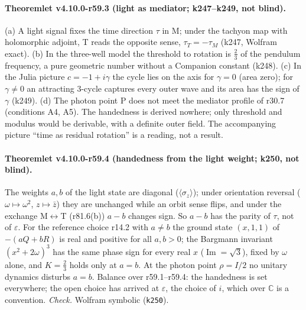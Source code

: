 \paragraph{Theoremlet v4.10.0-r59.3 (light as mediator; k247--k249, not blind).}
(a) A light signal fixes the time direction \(\tau\) in M; under the tachyon map with holomorphic adjoint, T reads the opposite sense,
\(\tau_T=-\tau_M\) (k247, Wolfram exact).
(b) In the three-well model the threshold to rotation is \(\tfrac23\) of the pendulum frequency, a pure geometric number without a Companion
constant (k248).
(c) In the Julia picture \(c=-1+i\gamma\) the cycle lies on the axis for \(\gamma=0\) (area zero); for \(\gamma\neq0\) an attracting 3-cycle captures every
outer wave and its area has the sign of \(\gamma\) (k249).
(d) The photon point P does not meet the mediator profile of r30.7 (conditions A4, A5).
The handedness is derived nowhere; only threshold and modulus would be derivable, with a definite outer field.  The accompanying picture
``time as residual rotation'' is a reading, not a result.

\paragraph{Theoremlet v4.10.0-r59.4 (handedness from the light weight; k250, not blind).}
The weights \(a,b\) of the light state are diagonal (\(\langle\sigma_z\rangle\)); under orientation reversal (\(\omega\mapsto\omega^2\), \(z\mapsto\bar z\)) they are
unchanged while an orbit sense flips, and under the exchange M\(\leftrightarrow\)T (r81.6(b)) \(a-b\) changes sign.  So \(a-b\) has the parity of \(\tau\),
not of \(\varepsilon\).  For the reference choice r14.2 with \(a\neq b\) the ground state \((x,1,1)\) of \(-(aQ+bR)\) is real and positive for all \(a,b>0\);
the Bargmann invariant \((x^2+2\omega)^3\) has the same phase sign for every real \(x\) (\(\operatorname{Im}=\sqrt3\)), fixed by \(\omega\) alone, and \(K=\tfrac23\)
holds only at \(a=b\).  At the photon point \(\rho=I/2\) no unitary dynamics disturbs \(a=b\).  Balance over r59.1--r59.4: the handedness is set
everywhere; the open choice has arrived at \(\varepsilon\), the choice of \(i\), which over \(\mathbb C\) is a convention.  \emph{Check.} Wolfram symbolic (\texttt{k250}).

